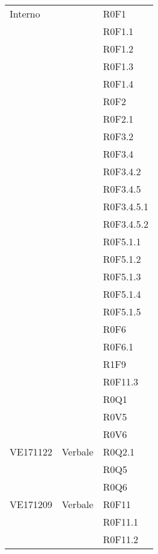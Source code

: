 \documentclass[AnalisiDeiRequisiti.tex]{subfiles}
\begin{document}
\begin{longtable}[H]{|p{2cm}|p{5cm}|p{5cm}|}
	Interno & & R0F1 \\
	& & R0F1.1 \\
	& & R0F1.2 \\
	& & R0F1.3 \\
	& & R0F1.4 \\
	& & R0F2 \\
	& & R0F2.1 \\
	& & R0F3.2 \\
	& & R0F3.4 \\
	& & R0F3.4.2 \\
	& & R0F3.4.5 \\
	& & R0F3.4.5.1 \\
	& & R0F3.4.5.2 \\
	& & R0F5.1.1 \\
	& & R0F5.1.2 \\
	& & R0F5.1.3 \\
	& & R0F5.1.4 \\
	& & R0F5.1.5 \\
	& & R0F6 \\
	& & R0F6.1 \\
	& & R1F9 \\
	& & R0F11.3 \\
	& & R0Q1 \\
	& & R0V5 \\
	& & R0V6 \\ \hline
	
	VE171122 & Verbale & R0Q2.1 \\
	& & R0Q5 \\
	& & R0Q6 \\ \hline
	
	VE171209 & Verbale & R0F11 \\
	& & R0F11.1 \\
	& & R0F11.2 \\ \hline
	

\end{longtable}
\end{document}
